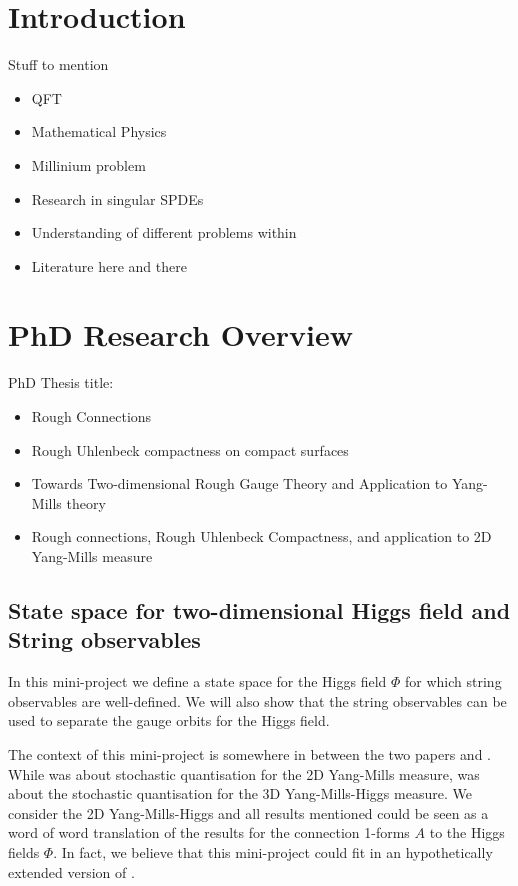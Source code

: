 \documentclass[./main.tex]{subfiles}
\begin{document}
\section{Introduction}
Stuff to mention 
\begin{itemize}
    \item QFT
    \item Mathematical Physics
    \item Millinium problem
    \item Research in singular SPDEs
    \item Understanding of different problems within
    \item Literature here and there
\end{itemize}
\section{PhD Research Overview}
PhD Thesis title: 
\begin{itemize}
    \item Rough Connections
    \item Rough Uhlenbeck compactness on compact surfaces
    \item  Towards Two-dimensional Rough Gauge Theory and Application to Yang-Mills theory
    \item Rough connections, Rough Uhlenbeck Compactness, and application to 2D Yang-Mills measure 
\end{itemize}

\subsection{State space for two-dimensional Higgs field and String observables}
In this mini-project we define a state space for the Higgs field $\Phi$ for which string observables are well-defined. We will also show that the string observables can be used to separate the gauge orbits for the Higgs field. 

The context of this mini-project is somewhere in between the two papers \cite{CCHS_2D_YM} and \cite{CCHS_3D_YMH}. While \cite{CCHS_2D_YM} was about stochastic quantisation for the 2D Yang-Mills measure, \cite{CCHS_3D_YMH} was about the stochastic quantisation for the 3D Yang-Mills-Higgs measure. We consider the 2D Yang-Mills-Higgs and all results mentioned could be seen as a word of word translation of the results for the connection 1-forms $A$ to the Higgs fields $\Phi$. In fact, we believe that this mini-project could fit in an hypothetically extended version of \cite{CCHS_2D_YM}.  
\end{document}
